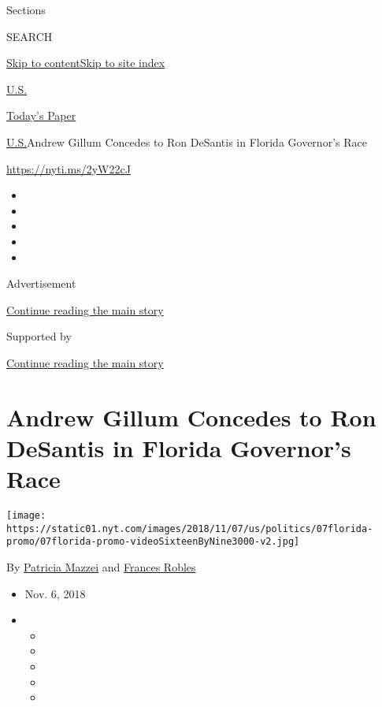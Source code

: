 Sections

SEARCH

\protect\hyperlink{site-content}{Skip to
content}\protect\hyperlink{site-index}{Skip to site index}

\href{https://www.nytimes.com/section/us}{U.S.}

\href{https://myaccount.nytimes.com/auth/login?response_type=cookie\&client_id=vi}{}

\href{https://www.nytimes.com/section/todayspaper}{Today's Paper}

\href{/section/us}{U.S.}\textbar{}Andrew Gillum Concedes to Ron DeSantis
in Florida Governor's Race

\url{https://nyti.ms/2yW22cJ}

\begin{itemize}
\item
\item
\item
\item
\item
\end{itemize}

Advertisement

\protect\hyperlink{after-top}{Continue reading the main story}

Supported by

\protect\hyperlink{after-sponsor}{Continue reading the main story}

\hypertarget{andrew-gillum-concedes-to-ron-desantis-in-florida-governors-race}{%
\section{Andrew Gillum Concedes to Ron DeSantis in Florida Governor's
Race}\label{andrew-gillum-concedes-to-ron-desantis-in-florida-governors-race}}

\texttt{[image: https://static01.nyt.com/images/2018/11/07/us/politics/07florida-promo/07florida-promo-videoSixteenByNine3000-v2.jpg]}

By \href{https://www.nytimes.com/by/patricia-mazzei}{Patricia Mazzei}
and \href{https://www.nytimes.com/by/frances-robles}{Frances Robles}

\begin{itemize}
\item
  Nov. 6, 2018
\item
  \begin{itemize}
  \item
  \item
  \item
  \item
  \item
  \end{itemize}
\end{itemize}

